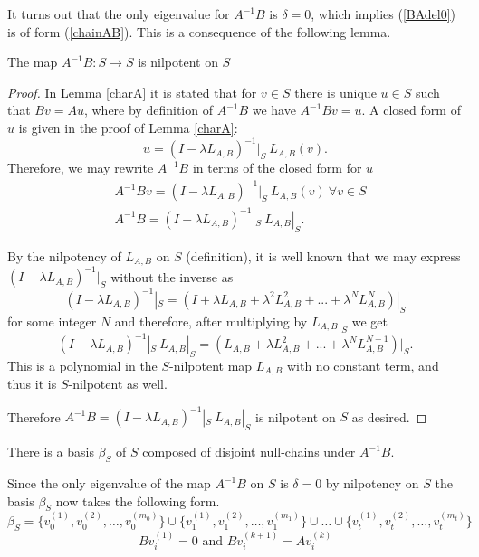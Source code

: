 It turns out that the only eigenvalue for $A^{-1}B$ is $\delta=0$, which implies (\ref{BAdel0}) is of form (\ref{chainAB}).
This is a consequence of the following lemma.

\begin{lemma}
    The map $A^{-1}B:S\rightarrow S$ is nilpotent on $S$
\end{lemma}

\begin{proof}
    In Lemma \ref{charA} it is stated that for $v\in S$ there is unique $u\in S$ such that $Bv=Au$, where by definition of $A^{-1}B$ we have $A^{-1}Bv=u$. A closed form of $u$ is given in the proof of Lemma \ref{charA}:$$u=(I-\lambda L_{A,B})^{-1}|_S\ L_{A,B} (v).$$
    Therefore, we may rewrite $A^{-1}B$ in terms of the closed form for $u$
    \begin{align*} 
    &A^{-1}Bv=(I-\lambda L_{A,B})^{-1}|_S\ L_{A,B} (v)\ \forall v\in S \\
    &A^{-1}B=(I-\lambda L_{A,B})^{-1}|_S\ L_{A,B}|_S.
    \end{align*}

    By the nilpotency of \(L_{A,B}\) on $S$ (definition), it is well known that we may express $(I-\lambda L_{A,B})^{-1}|_S$ without the inverse as
    $$(I-\lambda L_{A,B})^{-1}|_S=(I+\lambda L_{A,B}+\lambda^2 L_{A,B}^2+...+\lambda ^{N}L_{A,B}^{N})|_S$$for some integer $N$ and therefore, after multiplying by $L_{A,B}|_S$ we get $$(I-\lambda L_{A,B})^{-1}|_S\ L_{A,B}|_S=(L_{A,B}+\lambda L_{A,B}^2+...+\lambda ^{N}L_{A,B}^{N+1})|_S.$$This is a polynomial in the $S$-nilpotent map $L_{A,B}$ with no constant term, and thus it is $S$-nilpotent as well.
    
    Therefore $A^{-1}B=(I-\lambda L_{A,B})^{-1}|_S\ L_{A,B}|_S$ is nilpotent on $S$ as desired. 
    
    
    \end{proof}
\newpage
    \begin{corollary}\label{betterform}
        There is a basis $\beta_S$ of $S$ composed of disjoint null-chains under $A^{-1}B.$
        
    \end{corollary}
    Since the only eigenvalue of the map $A^{-1}B$ on $S$ is $\delta=0$ by nilpotency on \(S\) the basis $\beta_S$ now takes the following form.
    \begin{equation}\label{BAdel2}
    \beta_S=\{v_{0}^{(1)},v_{0}^{(2)},\dots,v_{0}^{(m_0)}\} \cup \{v_{1}^{(1)},v_{1}^{(2)},\dots,v_{1}^{(m_1)}\} \cup \dots \cup \{v_{t}^{(1)},v_{t}^{(2)},\dots,v_{t}^{(m_t)}\} 
 \end{equation}
\begin{equation}
   Bv_{i}^{(1)}=0 \text{ and } Bv_{i}^{(k+1)}=Av_{i}^{(k)}
\end{equation}

